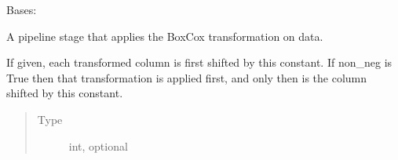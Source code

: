 \documentclass[letterpaper,10pt,english]{sphinxmanual}
\begin{document}
\begin{fulllineitems}
\label{\detokenize{dalio.pipe:dalio.pipe.col_generation.BoxCox}}
Bases: {\hyperref[\detokenize{dalio.pipe:dalio.pipe.col_generation.Custom}]{}}

A pipeline stage that applies the BoxCox transformation on data.

\begin{fulllineitems}
\label{\detokenize{dalio.pipe:dalio.pipe.col_generation.BoxCox.const_shift}}
If given, each transformed column is
first shifted by this constant. If non\_neg is True then that
transformation is applied first, and only then is the column
shifted by this constant.
\begin{quote}\begin{description}
\item[{Type}] \leavevmode
int, optional

\end{description}\end{quote}

\end{fulllineitems}


\end{fulllineitems}

\end{document}
